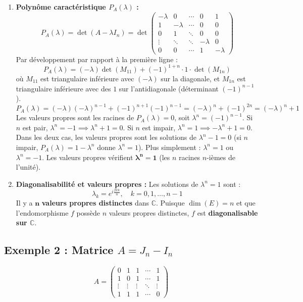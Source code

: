 \documentclass[french]{yLectureNote}
\begin{document}
\begin{enumerate}
    \item \textbf{Polynôme caractéristique $P_A(\lambda)$ :}
    $$P_A(\lambda) = \det(A - \lambda I_n) = \det \begin{pmatrix} -\lambda & 0 & \cdots & 0 & 1 \\ 1 & -\lambda & \cdots & 0 & 0 \\ 0 & 1 & \ddots & 0 & 0 \\ \vdots & \ddots & \ddots & -\lambda & 0 \\ 0 & 0 & \cdots & 1 & -\lambda \end{pmatrix}$$
    Par développement par rapport à la première ligne :
    $$P_A(\lambda) = (-\lambda) \det(M_{11}) + (-1)^{1+n} \cdot 1 \cdot \det(M_{1n})$$
    où $M_{11}$ est triangulaire inférieure avec $(-\lambda)$ sur la diagonale, et $M_{1n}$ est triangulaire inférieure avec des $1$ sur l'antidiagonale (déterminant $(-1)^{n-1}$).
    $$P_A(\lambda) = (-\lambda)(-\lambda)^{n-1} + (-1)^{n+1} (-1)^{n-1} = (-\lambda)^n + (-1)^{2n} = (-\lambda)^n + 1$$
    Les valeurs propres sont les racines de $P_A(\lambda)=0$, soit $\lambda^n = (-1)^{n-1}$.
    Si $n$ est pair, $\lambda^n = -1 \implies \lambda^n+1=0$. Si $n$ est impair, $\lambda^n = 1 \implies -\lambda^n+1=0$.
    Dans les deux cas, les valeurs propres sont les solutions de $\lambda^n - 1 = 0$ (si $n$ impair, $P_A(\lambda) = 1-\lambda^n$ donne $\lambda^n=1$). Plus simplement : $\lambda^n=1$ ou $\lambda^n=-1$.
    Les valeurs propres vérifient $\mathbf{\lambda^n = 1}$ (les $n$ racines $n$-ièmes de l'unité).

    \item \textbf{Diagonalisabilité et valeurs propres :}
    Les solutions de $\lambda^n = 1$ sont :
    $$\lambda_k = e^{i \frac{2\pi k}{n}}, \quad k = 0, 1, \ldots, n-1$$
    Il y a $\mathbf{n}$ \textbf{valeurs propres distinctes} dans $\mathbb{C}$.
    Puisque $\dim(E)=n$ et que l'endomorphisme $f$ possède $n$ valeurs propres distinctes, $f$ est \textbf{diagonalisable sur $\mathbb{C}$}.
\end{enumerate}


\subsection{Exemple 2 : Matrice $A = J_n - I_n$}
$$A = \begin{pmatrix} 0 & 1 & 1 & \cdots & 1 \\ 1 & 0 & 1 & \cdots & 1 \\ \vdots & \vdots & \vdots & \ddots & \vdots \\ 1 & 1 & 1 & \cdots & 0 \end{pmatrix}$$
\end{document}
